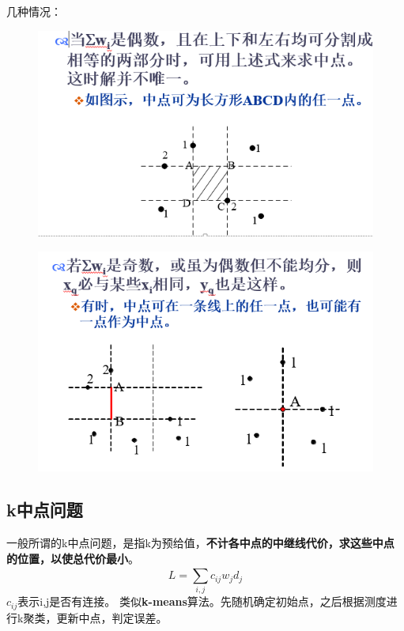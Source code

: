 几种情况：
\begin{figure}[H]
	\centering
	\includegraphics[width=0.7\linewidth]{figures/screenshot079}
	\caption{}
	\label{fig:screenshot079}
\end{figure}
\begin{figure}[H]
	\centering
	\includegraphics[width=0.7\linewidth]{figures/screenshot080}
	\caption{}
	\label{fig:screenshot080}
\end{figure}

\subsection{k中点问题}
一般所谓的k中点问题，是指k为预给值，\textbf{不计各中点的中继线代价，求这些中点的位置，以使总代价最小}。
\begin{equation}\label{key}
L = \sum_{i,j}^{} c_{ij}w_jd_j
\end{equation}
$ c_{ij} $表示i,j是否有连接。
类似\textbf{k-means}算法。先随机确定初始点，之后根据测度进行k聚类，更新中点，判定误差。

